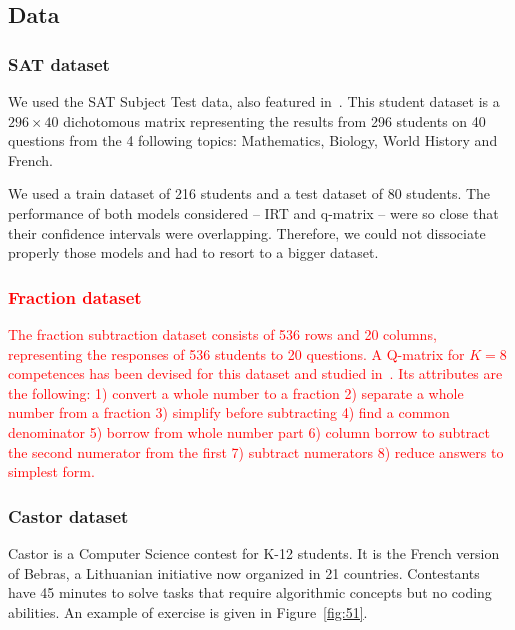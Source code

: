 \documentclass{edm_template}
\newcommand\alert[1]{\textcolor{red}{#1}}
\begin{document}
\subsection{Data} %

\subsubsection{SAT dataset}

We used the SAT Subject Test data, also featured in~\cite{Winters2005, Desmarais2011}. This student dataset is a $296 \times 40$ dichotomous matrix representing the results from 296 students on 40 questions from the 4 following topics: Mathematics, Biology, World History and French.

We used a train dataset of 216 students and a test dataset of 80 students. The performance of both models considered -- IRT and q-matrix -- were so close that their confidence intervals were overlapping. Therefore, we could not dissociate properly those models and had to resort to a bigger dataset.

\subsubsection{\alert{Fraction dataset}}

\alert{The fraction subtraction dataset consists of 536 rows and 20 columns, representing the responses of 536 students to 20 questions. A Q-matrix for $K = 8$ competences has been devised for this dataset and studied in~\cite{DeLaTorreDouglas2004,DeCarlo2010}. Its attributes are the following:
1) convert a whole number to a fraction
2) separate a whole number from a fraction
3) simplify before subtracting
4) find a common denominator
5) borrow from whole number part
6) column borrow to subtract the second numerator from the first
7) subtract numerators
8) reduce answers to simplest form.}

\subsubsection{Castor dataset}

Castor is a Computer Science contest for K-12 students. It is the French version of Bebras, a Lithuanian initiative now organized in 21 countries. Contestants have 45 minutes to solve tasks that require algorithmic concepts but no coding abilities. An example of exercise is given in Figure~\ref{fig:51}.
\end{document}

